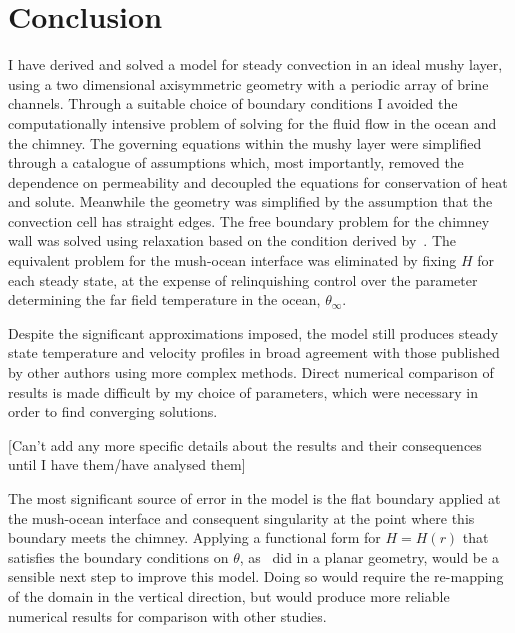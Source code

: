 \documentclass[11pt]{proc}
\begin{document}
\section{Conclusion}
\label{sec:conclusion}
I have derived and solved a model for steady convection in an ideal mushy layer, using a two dimensional axisymmetric geometry with a periodic array of brine channels. Through a suitable choice of boundary conditions I avoided the computationally intensive problem of solving for the fluid flow in the ocean and the chimney. The governing equations within the mushy layer were simplified through a catalogue of assumptions which, most importantly, removed the dependence on permeability and decoupled the equations for conservation of heat and solute. Meanwhile the geometry was simplified by the assumption that the convection cell has straight edges. The free boundary problem for the chimney wall was solved using relaxation based on the condition derived by~\citet*{schulze-worster-99}. The equivalent problem for the mush-ocean interface was eliminated by fixing $H$ for each steady state, at the expense of relinquishing control over the parameter determining the far field temperature in the ocean, $\theta_\infty$.

Despite the significant approximations imposed, the model still produces steady state temperature and velocity profiles in broad agreement with those published by other authors using more complex methods. Direct numerical comparison of results is made difficult by my choice of parameters, which were necessary in order to find converging solutions. 

[Can't add any more specific details about the results and their consequences until I have them/have analysed them]

The most significant source of error in the model is the flat boundary applied at the mush-ocean interface and consequent singularity at the point where this boundary meets the chimney. Applying a functional form for $H = H(r)$ that satisfies the boundary conditions on $\theta$, as~\citet*{schulze-worster-98} did in a planar geometry, would be a sensible next step to improve this model. Doing so would require the re-mapping of the domain in the vertical direction, but would produce more reliable numerical results for comparison with other studies.

\newpage
{}
\end{document}
